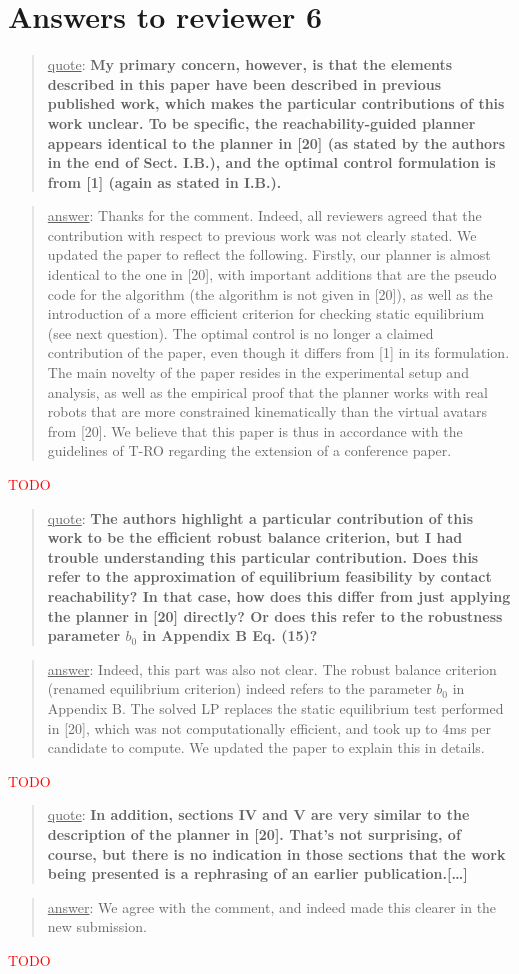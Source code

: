 \documentclass[a4paper]{article}
\newcommand{\ndone}[0]{\textcolor{red}{TODO}}
\newcommand\quot[1]{\begin{quote} \underline{quote}: \textbf{#1}\end{quote}}
\newcommand\as[1]{\begin{quote} \underline{answer}: {#1}\end{quote} }
\begin{document}
\section{Answers to reviewer 6}
\quot{ My primary concern, however,
is that the elements described in this paper have been described in
previous published work, which makes the particular contributions of
this work unclear. To be specific, the reachability-guided planner
appears identical to the planner in [20] (as stated by the authors in
the end of Sect. I.B.), and the optimal control formulation is from [1]
(again as stated in I.B.).}
\as{Thanks for the comment. Indeed, all reviewers agreed that the contribution with respect to previous work was not clearly stated. We updated the paper to reflect the following. Firstly, our planner is almost identical to the one in [20], with important additions that are the pseudo code for the algorithm (the algorithm is not given in [20]), as well as the introduction of a more efficient criterion
for checking static equilibrium (see next question). The optimal control is no longer a claimed contribution of the paper, even though it differs from [1] in its formulation. The main
novelty of the paper resides in the experimental setup and analysis, as well as the empirical proof that the planner works with real robots that are more constrained kinematically than the virtual avatars from [20]. We believe that this paper is thus in accordance with the guidelines of T-RO regarding the extension of a conference paper.}\ndone

\quot{The authors highlight a particular
contribution of this work to be the efficient robust balance criterion,
but I had trouble understanding this particular contribution. Does this
refer to the approximation of equilibrium feasibility by contact
reachability? In that case, how does this differ from just applying the
planner in [20] directly? Or does this refer to the robustness
parameter $b_0$ in Appendix B Eq. (15)?}
\as{Indeed, this part was also not clear. The robust balance criterion (renamed equilibrium criterion) indeed refers to the parameter $b_0$ in Appendix B. The solved
LP replaces the static equilibrium test performed in [20], which was not computationally efficient, and took up to 4ms per candidate to compute. We updated the paper to explain
this in details.}\ndone

\quot{In addition, sections IV and V are very similar to the description of
the planner in [20]. That's not surprising, of course, but there is no
indication in those sections that the work being presented is a
rephrasing of an earlier publication.[\dots] }
\as{We agree with the comment, and indeed made this clearer in the new submission.}\ndone
\end{document}
